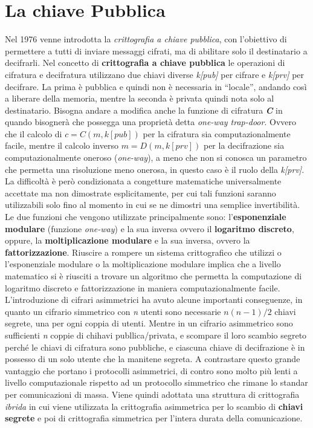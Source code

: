 \section{La chiave Pubblica}
Nel 1976 venne introdotta la \textit{crittografia a chiave pubblica}, con l'obiettivo di permettere a tutti di inviare messaggi cifrati, ma di abilitare solo il destinatario a decifrarli. Nel concetto di \textbf{crittografia a chiave pubblica} le operazioni di cifratura e decifratura utilizzano due chiavi diverse \textit{k[pub]} per cifrare e \textit{k[prv]} per decifrare. La prima è pubblica e quindi non è necessaria in ``locale'', andando così a liberare della memoria, mentre la seconda è privata quindi nota solo al destinatario. 
\newline
Bisogna andare a modifica anche la funzione di cifratura \textbf{\textit{C}} in quando bisognerà che possegga una proprietà detta \textit{one-way trap-door}. Ovvero che il calcolo di $c = C(m, k[pub])$ per la cifratura sia computazionalmente facile, mentre il calcolo inverso $m = D(m, k[prv])$ per la decifrazione sia computazionalmente oneroso (\textit{one-way}), a meno che non si conosca un parametro che permetta una risoluzione meno onerosa, in questo caso è il ruolo della \textit{k[prv]}. La difficoltà è però condizionata a congetture matematiche universalmente accettate ma non dimostrate esplicitamente, per cui tali funzioni saranno utilizzabili solo fino al momento in cui se ne dimostri una semplice invertibilità. Le due funzioni che vengono utilizzate principalmente sono: l'\textbf{esponenziale modulare} (funzione \textit{one-way}) e la sua inversa ovvero il \textbf{logaritmo discreto}, oppure, la \textbf{moltiplicazione modulare} e la sua inversa, ovvero la \textbf{fattorizzazione}. 
\newline
Riuscire a rompere un sistema crittografico che utilizzi o l'esponenziale modulare o la moltiplicazione modulare implica che a livello matematico si è riusciti a trovare un algoritmo che permetta la computazione di logaritmo discreto e fattorizzazione in maniera computazionalmente facile.
\newline
L'introduzione di cifrari asimmetrici ha avuto alcune importanti conseguenze, in quanto un cifrario simmetrico con \textit{n} utenti sono necessarie $n(n - 1)/2$ chiavi segrete, una per ogni coppia di utenti. Mentre in un cifrario asimmetrico sono sufficienti \textit{n} coppie di chihavi publlica/privata, e scompare il loro scambio segreto perché le chiavi di cifratura sono pubbliche, e ciascuna chiave di decifrazione è in possesso di un solo utente che la manitene segreta.
\newline
A contrastare questo grande vantaggio che portano i protocolli asimmetrici, di contro sono molto più lenti a livello computazionale rispetto ad un protocollo simmetrico che rimane lo standar per comunicazioni di massa. Viene quindi adottata una struttura di crittografia \textit{ibrida} in cui viene utilizzata la crittografia asimmetrica per lo scambio di \textbf{chiavi segrete} e poi di crittografia simmetrica per l'intera durata della comunicazione.